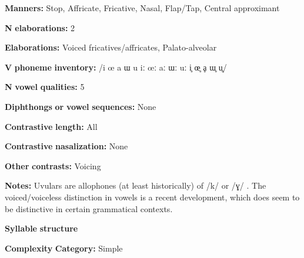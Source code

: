 \begin{styleBody}
\textbf{Manners:} Stop, Affricate, Fricative, Nasal, Flap/Tap, Central approximant
\end{styleBody}

\begin{styleBody}
\textbf{N} \textbf{elaborations:} 2
\end{styleBody}

\begin{styleBody}
\textbf{Elaborations:} Voiced fricatives/affricates, Palato-alveolar
\end{styleBody}

\begin{styleBody}
\textbf{V} \textbf{phoneme} \textbf{inventory:} /i œ a ɯ u iː œː aː ɯː uː i̥ œ̥ ḁ ɯ̥ u̥/
\end{styleBody}

\begin{styleBody}
\textbf{N} \textbf{vowel} \textbf{qualities:} 5
\end{styleBody}

\begin{styleBody}
\textbf{Diphthongs} \textbf{or} \textbf{vowel} \textbf{sequences:} None
\end{styleBody}

\begin{styleBody}
\textbf{Contrastive} \textbf{length:} All
\end{styleBody}

\begin{styleBody}
\textbf{Contrastive} \textbf{nasalization:} None
\end{styleBody}

\begin{styleBody}
\textbf{Other} \textbf{contrasts:} Voicing
\end{styleBody}

\begin{styleBody}
\textbf{Notes:} Uvulars are allophones (at least historically) of /k/ or /ɣ/ \citep[26]{Givón2011}. The voiced/voiceless distinction in vowels is a recent development, which does seem to be distinctive in certain grammatical contexts.
\end{styleBody}

\begin{styleBody}
\textbf{Syllable} \textbf{structure}
\end{styleBody}

\begin{styleBody}
\textbf{Complexity} \textbf{Category:} Simple
\end{styleBody}

